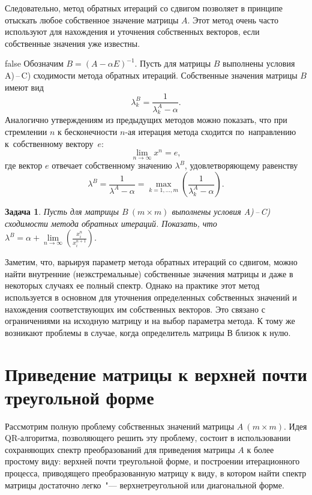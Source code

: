 \documentclass[11pt,a4paper,twoside]{report}
\numberwithin{equation}{section}
\newtheorem*{problem}{Задача}
\theoremstyle{definition}
\theoremstyle{plain}
\begin{document}
Следовательно, метод обратных итераций со сдвигом позволяет в принципе
отыскать любое собственное значение матрицы $A$. Этот метод очень часто
используют для нахождения и уточнения собственных векторов, если собственные
значения уже известны.

\ifx false
Обозначим $B=(A-\alpha E)^{-1}$.
Пусть для матрицы $B$ выполнены условия A)\,--\,C) сходимости метода
обратных итераций. Собственные значения матрицы $B$ имеют вид
%
$$
    \lambda_k^B=\frac{1}{\lambda_k^A-\alpha}.
$$
%
Аналогично утверждениям из предыдущих методов можно показать, что
при стремлении $n$ к бесконечности $n$-ая итерация метода сходится
по~направлению к~собственному вектору~$e$:
%
$$
     \lim_{n\to\infty}x^n=e,
$$
%
где вектор $e$ отвечает собственному значению $\lambda^B$, удовлетворяющему равенству
%
$$
    \lambda^B=\frac{1}{\lambda^A-\alpha} = \underset{k=1,\ldots,m}
    \max{\left(\frac{1}{\lambda_k^A-\alpha}\right)}.
$$
%
%
\begin{problem}
    Пусть для матрицы $B~(m \times m)$ выполнены
    условия A)\,--\,C) сходимости метода обратных итераций.
    Показать, что
    $\lambda^B =\alpha +
        \underset{n\to\infty}\lim\left(\frac{x^n_i}{x^{n+1}_i}\right)$.
\end{problem}
%


Заметим, что, варьируя параметр метода обратных итераций со сдвигом,
можно найти внутренние (неэкстремальные) собственные значения матрицы и даже
в некоторых случаях ее полный спектр. Однако на практике этот метод используется
в основном для уточнения определенных собственных значений и нахождения соответствующих
им собственных векторов. Это связано с ограничениями на исходную матрицу и
на выбор параметра метода. К тому же возникают проблемы в случае,
когда определитель матрицы $В$ близок к нулю.
\fi
%
\section{Приведение матрицы к верхней почти треугольной форме}
%
Рассмотрим полную проблему собственных значений матрицы $A~(m \times m)$.
Идея QR-алгоритма, позволяющего решить эту проблему, состоит в использовании
сохраняющих спектр преобразований для приведения матрицы $A$ к
более простому виду: верхней почти треугольной форме, и построении
итерационного процесса, приводящего преобразованную матрицу к виду,
в котором найти спектр матрицы достаточно легко~"---
верхнетреугольной или диагональной форме.
\end{document}
